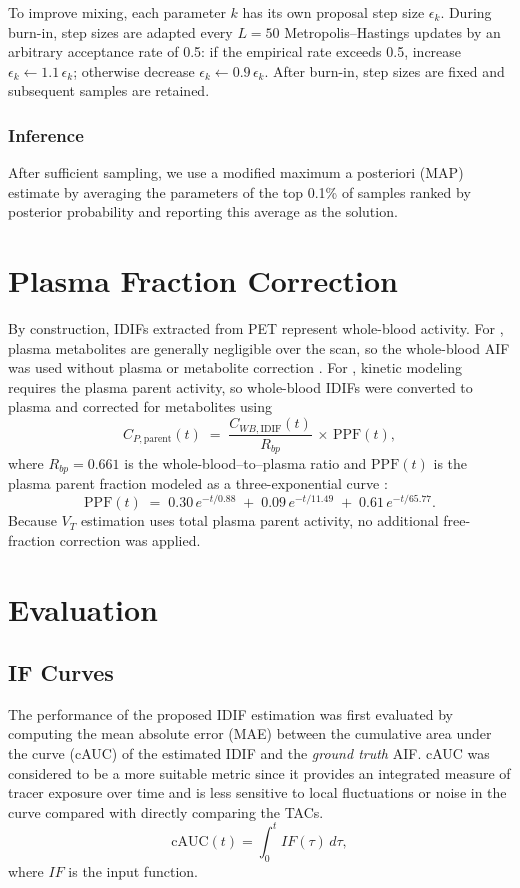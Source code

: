 To improve mixing, each parameter \(k\) has its own proposal step size \(\epsilon_k\).
During burn-in, step sizes are adapted every \(L=50\) Metropolis–Hastings updates by an arbitrary acceptance rate of 0.5: if the empirical rate exceeds 0.5, increase \(\epsilon_k \leftarrow 1.1\,\epsilon_k\); otherwise decrease \(\epsilon_k \leftarrow 0.9\,\epsilon_k\).
After burn-in, step sizes are fixed and subsequent samples are retained.

\subsubsection{Inference}
After sufficient sampling, we use a modified maximum a posteriori (MAP) estimate by averaging the parameters of the top 0.1\% of samples ranked by posterior probability and reporting this average as the solution.
\section{Plasma Fraction Correction}
By construction, IDIFs extracted from PET represent whole-blood activity.
For \fdg, plasma metabolites are generally negligible over the scan, so the whole-blood AIF was used without plasma or metabolite correction \cite{gambhir1989simple}.
For \yohimbine, kinetic modeling requires the plasma parent activity, so whole-blood IDIFs were converted to plasma and corrected for metabolites using
\begin{equation}
	C_{P,\mathrm{parent}}(t) \;=\; \frac{C_{WB,\mathrm{IDIF}}(t)}{R_{bp}} \,\times\, \mathrm{PPF}(t),
\end{equation}
where \(R_{bp}=0.661\) is the whole-blood–to–plasma ratio and \(\mathrm{PPF}(t)\) is the plasma parent fraction modeled as a three-exponential curve \cite{laurencin2021modeling}:
\begin{equation}
	\mathrm{PPF}(t) \;=\; 0.30\,e^{-t/0.88} \;+\; 0.09\,e^{-t/11.49} \;+\; 0.61\,e^{-t/65.77}.
\end{equation}
Because \(V_T\) estimation uses total plasma parent activity, no additional free-fraction correction was applied.

\section{Evaluation}

\subsection{IF Curves}
The performance of the proposed IDIF estimation was first evaluated by computing the mean absolute error (MAE) between the cumulative area under the curve (cAUC) of the estimated IDIF and the \textit{ground truth} AIF.
cAUC was considered to be a more suitable metric since it provides an integrated measure of tracer exposure over time and is less sensitive to local fluctuations or noise in the curve compared with directly comparing the TACs.
\begin{equation}
	\textrm{cAUC}(t) =  \int_{0}^{t} IF(\tau) \, d\tau,
\end{equation}
where \(IF\) is the input function.

